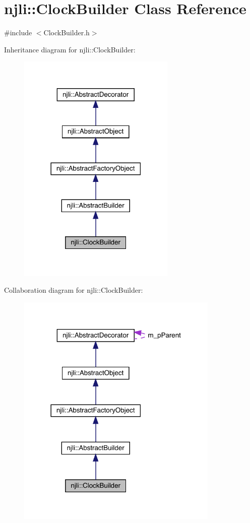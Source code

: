 \hypertarget{classnjli_1_1_clock_builder}{}\section{njli\+:\+:Clock\+Builder Class Reference}
\label{classnjli_1_1_clock_builder}


{\ttfamily \#include $<$Clock\+Builder.\+h$>$}



Inheritance diagram for njli\+:\+:Clock\+Builder\+:\nopagebreak
\begin{figure}[H]
\begin{center}
\leavevmode
\includegraphics[width=213pt]{classnjli_1_1_clock_builder__inherit__graph}
\end{center}
\end{figure}


Collaboration diagram for njli\+:\+:Clock\+Builder\+:\nopagebreak
\begin{figure}[H]
\begin{center}
\leavevmode
\includegraphics[width=273pt]{classnjli_1_1_clock_builder__coll__graph}
\end{center}
\end{figure}
